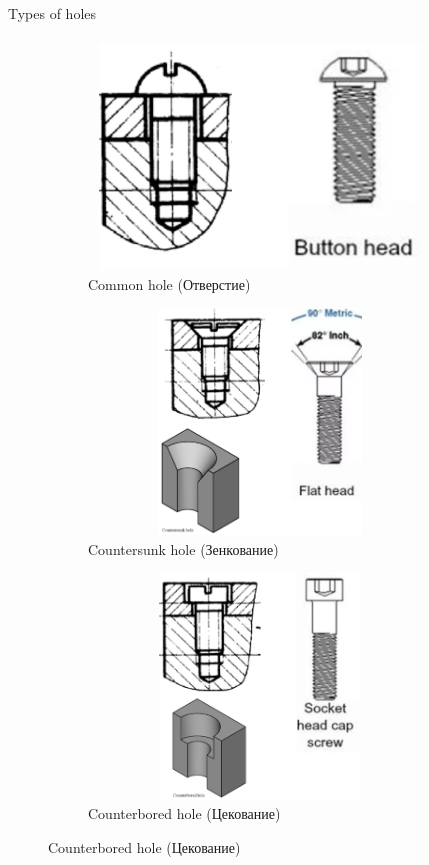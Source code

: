 \documentclass[aspectratio=169]{beamer}
\begin{document}
\begin{frame}[t]{Types of holes}
    \framesubtitle{}
    \vspace{-0.6cm}
    \begin{figure}[H]
        \begin{subfigure}{0.32\textwidth}
            \centering\includegraphics[height=6cm,width=1\textwidth,keepaspectratio]{common_hole.png}
            \caption*{Common hole (Отверстие)}
            \label{fig:common_hole.png}
        \end{subfigure}
        \begin{subfigure}{0.32\textwidth}
            \centering\includegraphics[height=6cm,width=1\textwidth,keepaspectratio]{countersunk_hole.png}
            \caption*{Countersunk hole (Зенкование)}
            \label{fig:countersunk_hole.png}
        \end{subfigure}
        \begin{subfigure}{0.32\textwidth}
            \centering\includegraphics[height=6cm,width=1\textwidth,keepaspectratio]{counterbored_hole.png}
            \caption*{Counterbored hole (Цекование)}
            \label{fig:counterbored_hole.png}
        \end{subfigure}
    \end{figure}
\end{frame}
\end{document}
